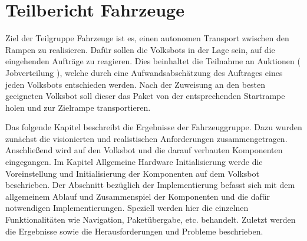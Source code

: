 \section{Teilbericht Fahrzeuge}

Ziel der Teilgruppe Fahrzeuge ist es, einen autonomen Transport zwischen den Rampen zu realisieren. Dafür sollen die Volksbots in der Lage sein, auf die eingehenden Aufträge zu reagieren.
Dies beinhaltet die Teilnahme an Auktionen ( Jobverteilung ), welche durch eine Aufwandsabschätzung des Auftrages eines jeden Volksbots entschieden werden. Nach der Zuweisung an den besten geeigneten Volksbot soll dieser das Paket von der entsprechenden Startrampe holen und zur Zielrampe transportieren.

Das folgende Kapitel beschreibt die Ergebnisse der Fahrzeuggruppe. Dazu wurden zunächst die visionierten und realistischen Anforderungen zusammengetragen. Anschließend wird auf den Volksbot und die darauf verbauten Komponenten eingegangen. Im Kapitel Allgemeine Hardware Initialisierung werde die Voreinstellung und Initialisierung der Komponenten auf dem Volksbot beschrieben. Der Abschnitt bezüglich der Implementierung befasst sich mit dem allgemeinem Ablauf und Zusammenspiel der Komponenten und die dafür notwendigen Implementierungen. Speziell werden hier die einzelnen Funktionalitäten wie Navigation, Paketübergabe, etc. behandelt. Zuletzt werden die Ergebnisse sowie die Herausforderungen und Probleme beschrieben.




































